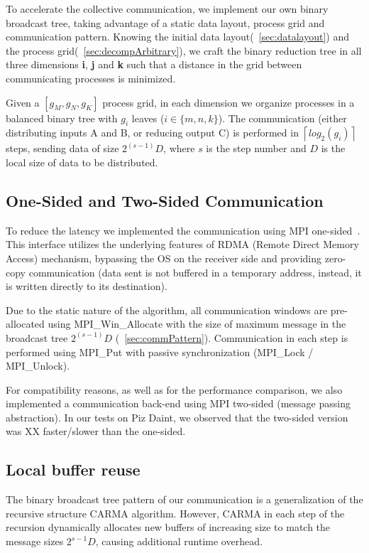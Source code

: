 \documentclass[sigplan,review,anonymous,10pt]{acmart}\settopmatter{printfolios=true,printccs=false,printacmref=false}
\begin{document}
To accelerate the collective communication, we implement our own binary 
broadcast 
tree, taking advantage of a static data layout, process grid and communication 
pattern.
 Knowing the initial data 
layout(~\cref{sec:datalayout}) and the process 
grid(~\cref{sec:decompArbitrary}), we craft the binary reduction tree 
in all three dimensions \textbf{i}, \textbf{j} and \textbf{k} such that a 
distance in the grid between communicating processes is minimized. 

Given a $[g_M, g_N, g_K]$ process grid, in each dimension we organize processes 
in a balanced binary tree with $g_i$ leaves ($i \in \{m,n,k\}$). The 
communication 
(either distributing inputs A and B, or reducing output C) is performed in 
$\left \lceil{log_2(g_i)} \right \rceil$ steps, sending data of size $2^(s-1) 
D$, where $s$ is the step 
number and $D$ is the local size of data to be distributed.

\subsection{One-Sided and Two-Sided Communication}
\label{sec:rdma}
To reduce the latency we implemented the communication 
using MPI one-sided~\cite{mpi3-rma-overview}. This interface utilizes the 
underlying features of RDMA (Remote Direct Memory Access) mechanism, bypassing 
the OS on the receiver side and providing zero-copy communication (data sent is 
not buffered in a temporary address, instead, it is written directly to its 
destination).

Due to the static nature of the algorithm, all communication windows are 
pre-allocated using MPI\_Win\_Allocate with the size of maximum message in the 
broadcast tree $2^(s-1) D$ (~\cref{sec:commPattern}). Communication in each 
step is performed using MPI\_Put with passive synchronization (MPI\_Lock / 
MPI\_Unlock).

For compatibility reasons, as well as for the performance comparison, we also 
implemented a communication back-end using MPI two-sided (message passing 
abstraction). In our tests on Piz Daint, we observed that the two-sided version 
was XX faster/slower than the one-sided.


\subsection{Local buffer reuse}
\label{sec:bufferReuse}
The binary broadcast tree pattern of our communication is a generalization of 
the recursive structure CARMA algorithm. However, CARMA in each step of the 
recursion dynamically allocates new buffers of increasing size to match the 
message sizes $2^{s-1} D$, causing additional runtime overhead.
\end{document}
